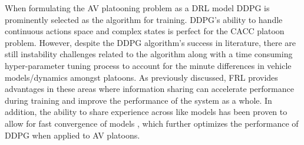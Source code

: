 When formulating the AV platooning problem as a DRL model DDPG is prominently selected
as the algorithm for training.  DDPG's ability to handle continuous actions space and
complex states is perfect for the CACC platoon problem.  However, despite the DDPG
algorithm's success in literature, there are still instability challenges related to
the algorithm along with a time consuming hyper-parameter tuning process to account
for the minute differences in vehicle models/dynamics amongst platoons. As previously
discussed, FRL provides advantages in these areas where information sharing can accelerate
performance during training and improve the performance of the system as a whole. In
addition, the ability to share experience across like models has been proven to allow
for fast convergence of models \cite{Lim2020}, which further optimizes the performance
of DDPG when applied to AV platoons.